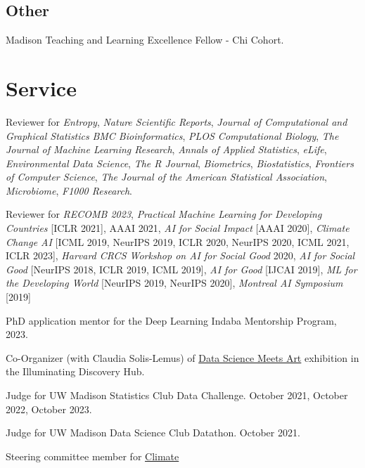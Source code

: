 \documentclass[letterpaper]{article}
\renewenvironment{itemize}{
  \begin{list}{}{
    \setlength{\leftmargin}{1.5em}
  }
}{
  \end{list}
}
\begin{document}
\subsection*{Other}
\begin{itemize}
\item Madison Teaching and Learning Excellence Fellow - Chi Cohort.
\end{itemize}

\section*{Service}

\begin{itemize}
\item Reviewer for \textit{Entropy}, \textit{Nature Scientific Reports}, \textit{Journal of Computational and Graphical Statistics} \textit{BMC Bioinformatics}, \textit{PLOS Computational
Biology}, \textit{The Journal of Machine Learning Research}, \textit{Annals of
Applied Statistics}, \textit{eLife}, \textit{Environmental Data Science}, \textit{The R Journal},
\textit{Biometrics}, \textit{Biostatistics}, \textit{Frontiers of Computer
Science}, \textit{The Journal of the American Statistical Association},
\textit{Microbiome}, \textit{F1000 Research}.
\item Reviewer for \textit{RECOMB 2023}, \textit{Practical Machine Learning for Developing Countries}
  [ICLR 2021], AAAI 2021, \textit{AI for Social Impact} [AAAI 2020],
  \textit{Climate Change AI} [ICML 2019, NeurIPS 2019, ICLR 2020, NeurIPS 2020, ICML 2021, ICLR 2023],
  \textit{Harvard CRCS Workshop on AI for Social Good} 2020, \textit{AI for
    Social Good} [NeurIPS 2018, ICLR 2019, ICML 2019], \textit{AI for Good}
         [IJCAI 2019], \textit{ML for the Developing World} [NeurIPS 2019,
           NeurIPS 2020], \textit{Montreal AI Symposium} [2019]
\item PhD application mentor for the Deep Learning Indaba Mentorship Program, 2023.
\item Co-Organizer (with Claudia Solis-Lemus) of
\href{https://illuminatingdiscovery.wisc.edu/technical-to-beautiful-data-as-art/}{Data Science Meets Art} exhibition in the Illuminating Discovery Hub.
\item Judge for UW Madison Statistics Club Data Challenge. October 2021, October 2022, October 2023.
\item Judge for UW Madison Data Science Club Datathon. October 2021.
\item Steering committee member for \href{https://www.climatechange.ai}{Climate
}
\end{itemize}
\end{document}
